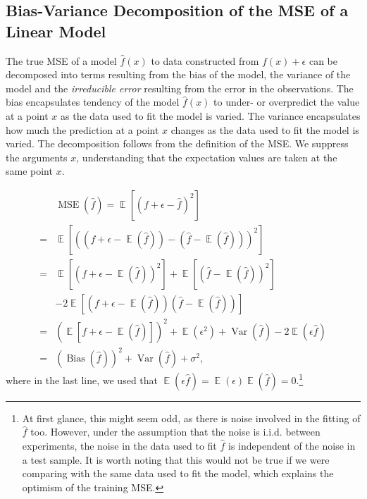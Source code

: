 \documentclass[twocolumn,english,notitlepage]{article}
\newcommand{\pclosed}[1]{\left(#1\right)}
\newcommand{\bclosed}[1]{\left[#1\right]}
\renewcommand{\expval}{\operatorname{\mathbb{E}}}
\renewcommand{\var}{\operatorname{Var}}
\newcommand{\bias}{\operatorname{Bias}}
\begin{document}
\renewcommand{\theequation}{\thesection.\arabic{equation}}
\begin{appendices}
    \section{Bias-Variance Decomposition of the MSE of a Linear Model} \label{app:sec:bvdecomp}
        The true MSE of a model $\hat{f}(x)$ to data constructed from $f(x) + \epsilon$ can be decomposed into terms resulting from the bias of the model, the variance of the model and the \textit{irreducible error} resulting from the error in the observations. The bias encapsulates tendency of the model $\hat{f}(x)$ to under- or overpredict the value at a point $x$ as the data used to fit the model is varied. The variance encapsulates how much the prediction at a point $x$ changes as the data used to fit the model is varied. The decomposition follows from the definition of the MSE. We suppress the arguments $x$, understanding that the expectation values are taken at the same point $x$.

        \begin{align} \nonumber
            &\operatorname{MSE}(\hat{f}) = \expval\bclosed{(f+\epsilon-\hat{f})^2} \\ \nonumber
            =& \expval\bclosed{\pclosed{(f+\epsilon-\expval(\hat{f}))- (\hat{f}-\expval(\hat{f}))}^2} \\ \nonumber
            =& \expval\bclosed{\pclosed{f+\epsilon-\expval(\hat{f})}^2} + \expval\bclosed{\pclosed{\hat{f}-\expval(\hat{f})}^2} \\ \nonumber
            &-2 \expval\bclosed{ (f+\epsilon-\expval(\hat{f})) (\hat{f}-\expval(\hat{f})) } \\ \nonumber
            =& \pclosed{\expval\bclosed{f+\epsilon-\expval(\hat{f})}}^2 + \expval(\epsilon^2) + \var(\hat{f}) - 2\expval(\epsilon \hat{f}) \\
            =& \pclosed{\bias(\hat{f})}^2 + \var(\hat{f}) + \sigma^2,
        \end{align}
        where in the last line, we used that $\expval(\epsilon\hat{f}) = \expval(\epsilon)\expval(\hat{f})=0$.\footnote{At first glance, this might seem odd, as there is noise involved in the fitting of $\hat{f}$ too. However, under the assumption that the noise is i.i.d. between experiments, the noise in the data used to fit $\hat{f}$ is independent of the noise in a test sample. It is worth noting that this would not be true if we were comparing with the same data used to fit the model, which explains the optimism of the training MSE.}


\end{appendices}
\end{document}
